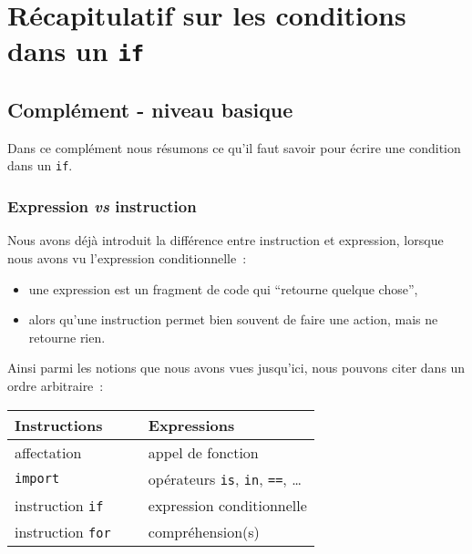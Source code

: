     
    
    
    

    

    \hypertarget{ruxe9capitulatif-sur-les-conditions-dans-un-if}{%
\section{\texorpdfstring{Récapitulatif sur les conditions dans un
\texttt{if}}{Récapitulatif sur les conditions dans un if}}\label{ruxe9capitulatif-sur-les-conditions-dans-un-if}}

    \hypertarget{compluxe9ment---niveau-basique}{%
\subsection{Complément - niveau
basique}\label{compluxe9ment---niveau-basique}}

    Dans ce complément nous résumons ce qu'il faut savoir pour écrire une
condition dans un \texttt{if}.

    \hypertarget{expression-vs-instruction}{%
\subsubsection{\texorpdfstring{Expression \emph{vs}
instruction}{Expression vs instruction}}\label{expression-vs-instruction}}

    Nous avons déjà introduit la différence entre instruction et expression,
lorsque nous avons vu l'expression conditionnelle~:

\begin{itemize}
\tightlist
\item
  une expression est un fragment de code qui ``retourne quelque chose'',
\item
  alors qu'une instruction permet bien souvent de faire une action, mais
  ne retourne rien.
\end{itemize}

    Ainsi parmi les notions que nous avons vues jusqu'ici, nous pouvons
citer dans un ordre arbitraire~:

\begin{longtable}[]{@{}lll@{}}
\toprule
Instructions & ~ & Expressions\tabularnewline
\midrule
\endhead
affectation & ~ & appel de fonction\tabularnewline
\texttt{import} & ~ & opérateurs \texttt{is}, \texttt{in}, \texttt{==},
\ldots{}\tabularnewline
instruction \texttt{if} & ~ & expression conditionnelle\tabularnewline
instruction \texttt{for} & ~ & compréhension(s)\tabularnewline
\bottomrule
\end{longtable}

